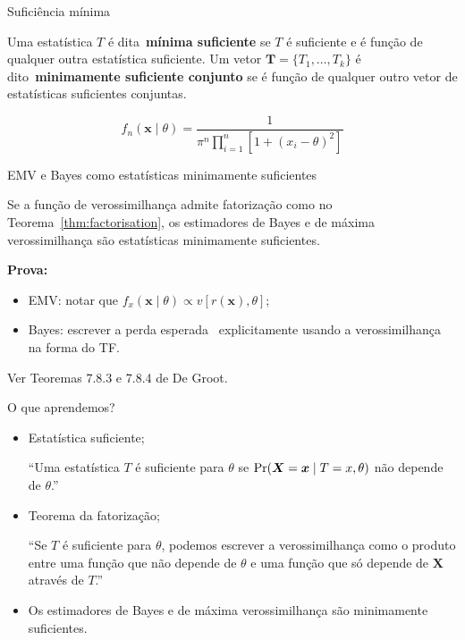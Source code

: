 \begin{frame}{Suficiência mínima}
\begin{defn}
 \label{def:minimal_sufficiency}
 Uma estatística $T$ é dita~\textbf{mínima suficiente} se $T$ é suficiente e é função de qualquer outra estatística suficiente.
 Um vetor $\boldsymbol{T} =  \{T_1, \ldots, T_k \}$ é dito~\textbf{minimamente suficiente conjunto} se é função de qualquer outro vetor de estatísticas suficientes conjuntas.
\end{defn}
\begin{obs}
 \begin{equation}
  f_n(\boldsymbol{x} \mid \theta) = \frac{1}{\pi^n \prod_{i=1}^n\left[1 + (x_i-\theta)^2\right]}
 \end{equation}
\end{obs}
\end{frame}

\begin{frame}{EMV e Bayes como estatísticas minimamente suficientes}
 \begin{theo}
  Se a função de verossimilhança admite fatorização como no Teorema~\ref{thm:factorisation}, os  estimadores de Bayes e de máxima verossimilhança são estatísticas minimamente suficientes.
 \end{theo}
\textbf{Prova:}
\begin{itemize}
 \item EMV: notar que $f_x(\boldsymbol{x} \mid \theta) \propto v[r(\boldsymbol{x}), \theta]$;
 \item Bayes: escrever a perda esperada~ explicitamente usando a verossimilhança na forma do TF.
\end{itemize}
Ver Teoremas 7.8.3 e 7.8.4 de De Groot.
\end{frame}


\begin{frame}{O que aprendemos?}
\begin{itemize}
  \item[\faLightbulbO] Estatística suficiente;
    
    ``Uma estatística $T$ é suficiente para $\theta$ se $\operatorname{Pr}(\boldsymbol{X} = \boldsymbol{x} \mid T = x, \theta)$ não depende de $\theta$.''
    
   \item[\faLightbulbO] Teorema da fatorização;
   
   ``Se $T$ é suficiente para $\theta$, podemos escrever a verossimilhança como o produto entre uma função que não depende de $\theta$ e uma função que só depende de $\boldsymbol{X}$ através de $T$.'' 
   
     \item[\faLightbulbO] Os estimadores de Bayes e de máxima verossimilhança são minimamente suficientes.   
    
  \end{itemize}
 \end{frame}

